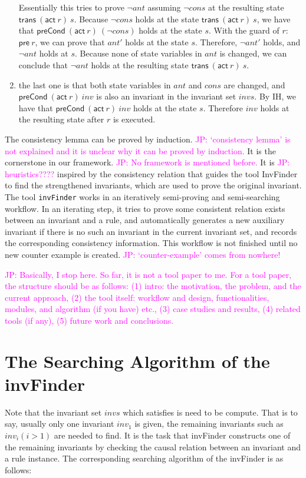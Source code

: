\documentclass{llncs}
\newcommand\JP[1]{\textcolor{magenta}{JP: #1}}
\begin{document}
\begin{enumerate}
Essentially this tries to prove $\neg ant$
assuming $\neg cons$ at the resulting state $\mathsf{trans}~(\mathsf{act}~r)~s$.
Because $\neg cons$ holds at the state $\mathsf{trans}~(\mathsf{act}~r)~s$,
we have that $\mathsf{preCond}~(\mathsf{act}~r)~(\neg cons)$ holds at the state $s$.
With the guard of $r$: $\mathsf{pre}~r$, we can prove that $ant'$ holds at the state $s$.
Therefore, $\neg ant'$ holds, and $\neg ant$ holds at $s$.
Because none of state variables in $ant$ is changed,
we can conclude that $\neg ant$ holds at the resulting state $\mathsf{trans}~(\mathsf{act}~r)~s$.

\item the last one is that both state variables in $ant$ and $cons$ are changed,
and $\mathsf{preCond}~(\mathsf{act}~r)~inv$ is also an invariant in the invariant set $invs$.
By IH, we have that $\mathsf{preCond}~(\mathsf{act}~r)~inv$ holds at the state $s$.
Therefore $inv$ holds at the resulting state after $r$ is executed.

\end{enumerate}

The consistency lemma can be proved by induction.
\JP{`consistency lemma' is not explained and it is unclear why it can be proved by induction.}
It is the cornerstone in our framework.
\JP{No framework is mentioned before.}
It is \JP{heuristics????} inspired by the
consistency relation that guides the tool {\sf InvFinder} to
find the strengthened invariants,
which are used to prove the original invariant.
The tool \texttt{invFinder} works in an iteratively semi-proving and semi-searching workflow.
In an iterating step, it tries to prove some consistent relation exists between an invariant and a rule,
and automatically generates a new auxiliary invariant
if there is no such an invariant in the current invariant set,
and records the corresponding consistency information.
This workflow is not finished until no new counter example is created.
\JP{`counter-example' comes from nowhere!}

\JP{Basically, I stop here. So far, it is not a tool paper to me.
For a tool paper, the structure should be as follows:
(1) intro: the motivation, the problem, and the current approach,
(2) the tool itself: workflow and design, functionalities, modules, and algorithm (if you have) etc.,
(3) case studies and results,
(4) related tools (if any),
(5) future work and conclusions.}

\section{The Searching Algorithm of the {\sf invFinder}}
Note that the invariant set $invs$ which satisfies is need to be compute. That is to say, usually only one invariant $inv_1$ is  given, the remaining invariants such as $inv_i(i>1)$ are needed to find. It is the task that {\sf invFinder} constructs one of the remaining invariants by checking the causal relation between an invariant and a rule instance. The corresponding searching algorithm of the {\sf invFinder} is as follows:
\end{document}
